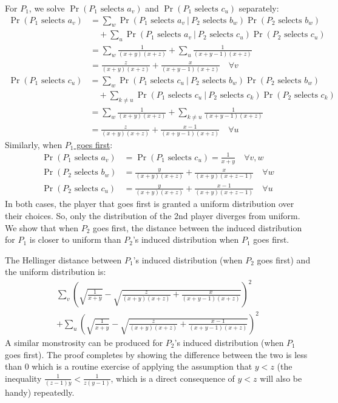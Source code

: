 For $P_1$, we solve $\Pr(P_1 \text{ selects } a_v)$ and $\Pr(P_1 \text{ selects } c_u)$ separately:
\begin{align*}
    \Pr(P_1 \text{ selects } a_v) 
    &= \sum_w \Pr(P_1 \text{ selects } a_v \ \vert \ P_2 \text{ selects } b_w)\Pr(P_2 \text{ selects } b_w) \\
    &\quad +\sum_u \Pr(P_1 \text{ selects } a_v \ \vert \ P_2 \text{ selects } c_u)\Pr(P_2 \text{ selects } c_u) \\
    &= \sum_w \frac{1}{(x+y)(x+z)} + \sum_u \frac{1}{(x+y-1)(x+z)} \\
    &= \frac{z}{(x+y)(x+z)} + \frac{x}{(x+y-1)(x+z)} \quad \forall v
\end{align*}
\begin{align*}
    \Pr(P_1 \text{ selects } c_u) 
    &= \sum_w \Pr(P_1 \text{ selects } c_u \ \vert \ P_2 \text{ selects } b_w)\Pr(P_2 \text{ selects } b_w) \\
    &\quad +\sum_{k \neq u} \Pr(P_1 \text{ selects } c_u \ \vert \ P_2 \text{ selects } c_k)\Pr(P_2 \text{ selects } c_k) \\
    &= \sum_w \frac{1}{(x+y)(x+z)} + \sum_{k \neq u} \frac{1}{(x+y-1)(x+z)} \\
    &= \frac{z}{(x+y)(x+z)} + \frac{x-1}{(x+y-1)(x+z)} \quad \forall u
\end{align*}
Similarly, when \ul{$P_1$ goes first}:
\begin{align*}
    \Pr(P_1 \text{ selects } a_v) &= \Pr(P_1 \text{ selects } c_u) = \frac{1}{x + y} \quad \forall v, w \\
    \Pr(P_2 \text{ selects } b_w) &= \frac{y}{(x+y)(x+z)} + \frac{x}{(x+y)(x+z-1)} \quad \forall w \\
    \Pr(P_2 \text{ selects } c_u) &= \frac{y}{(x+y)(x+z)} + \frac{x-1}{(x+y)(x+z-1)} \quad \forall u
\end{align*}
In both cases, the player that goes first is granted a uniform distribution over their choices.
So, only the distribution of the 2nd player diverges from uniform.
We show that when $P_2$ goes first, the distance between the induced distribution for $P_1$ is closer to uniform than $P_2$'s induced distribution when $P_1$ goes first.

The Hellinger distance between $P_1$'s induced distribution (when $P_2$ goes first) and the uniform distribution is:
\begin{multline*}
    \sum_v \left(\sqrt{\frac{1}{x+y}} - \sqrt{\frac{z}{(x+y)(x+z)} + \frac{x}{(x+y-1)(x+z)}}\right)^2 \\ 
    + \sum_u \left(\sqrt{\frac{1}{x+y}} - \sqrt{\frac{z}{(x+y)(x+z)} + \frac{x-1}{(x+y-1)(x+z)}}\right)^2
\end{multline*}
A similar monstrosity can be produced for $P_2$'s induced distribution (when $P_1$ goes first).
The proof completes by showing the difference between the two is less than $0$ which is a routine exercise of applying the assumption that $y < z$ (the inequality $\frac{1}{(z-1)y} < \frac{1}{z(y-1)}$, which is a direct consequence of $y < z$ will also be handy) repeatedly.
